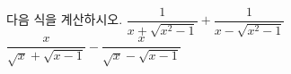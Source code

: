 다음 식을 계산하시오.
 $\dfrac{1}{x+\sqrt{x^2-1}}+\dfrac{1}{x-\sqrt{x^2-1}}$
 $\dfrac{x}{\sqrt{x}+\sqrt{x-1}}-\dfrac{x}{\sqrt{x}-\sqrt{x-1}}$
